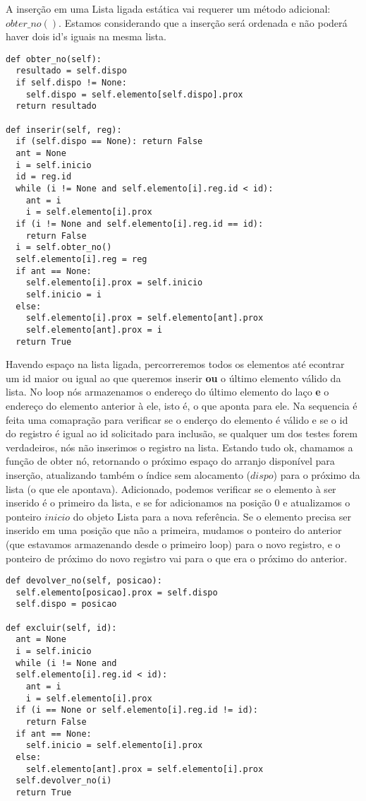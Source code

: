 \documentclass[a4paper, twocolumn]{article}
\theoremstyle{definition}
\begin{document}
A inserção em uma Lista ligada estática vai requerer um método adicional: $obter\_no()$. Estamos considerando que a inserção será ordenada e não poderá haver dois id's iguais na mesma lista.

\begin{lstlisting}[label=lista_ligada_estat_inserir,caption= Lista Ligada estática ordenada (inserção)]
def obter_no(self):
  resultado = self.dispo
  if self.dispo != None:
  	self.dispo = self.elemento[self.dispo].prox
  return resultado

def inserir(self, reg):
  if (self.dispo == None): return False
  ant = None
  i = self.inicio
  id = reg.id
  while (i != None and self.elemento[i].reg.id < id):
    ant = i
    i = self.elemento[i].prox
  if (i != None and self.elemento[i].reg.id == id): 
  	return False
  i = self.obter_no()
  self.elemento[i].reg = reg
  if ant == None:
    self.elemento[i].prox = self.inicio
    self.inicio = i
  else:
    self.elemento[i].prox = self.elemento[ant].prox
    self.elemento[ant].prox = i
  return True
\end{lstlisting}

Havendo espaço na lista ligada, percorreremos todos os elementos até econtrar um id maior ou igual ao que queremos inserir \textbf{ou} o último elemento válido da lista. No loop nós armazenamos o endereço do último elemento do laço \textbf{e} o endereço do elemento anterior à ele, isto é, o que aponta para ele. Na sequencia é feita uma comapração para verificar se o enderço do elemento é válido e se o id do registro é igual ao id solicitado para inclusão, se qualquer um dos testes forem verdadeiros, nós não inserimos o registro na lista. Estando tudo ok, chamamos a função de obter nó, retornando o próximo espaço do arranjo disponível para inserção, atualizando também o índice sem alocamento ($dispo$) para o próximo da lista (o que ele apontava). Adicionado, podemos verificar se o elemento à ser inserido é o primeiro da lista, e se for adicionamos na posição 0 e atualizamos o ponteiro $inicio$ do objeto Lista para a nova referência. Se o elemento precisa ser inserido em uma posição que não a primeira, mudamos o ponteiro do anterior (que estavamos armazenando desde o primeiro loop) para o novo registro, e o ponteiro de próximo do novo registro vai para o que era o próximo do anterior.

\begin{lstlisting}[label=lista_ligada_estat_remover,caption= Lista Ligada estática ordenada (remoção)]
def devolver_no(self, posicao):
  self.elemento[posicao].prox = self.dispo
  self.dispo = posicao

def excluir(self, id):
  ant = None
  i = self.inicio
  while (i != None and 
  self.elemento[i].reg.id < id):
    ant = i
    i = self.elemento[i].prox
  if (i == None or self.elemento[i].reg.id != id): 
  	return False
  if ant == None:
    self.inicio = self.elemento[i].prox
  else: 
    self.elemento[ant].prox = self.elemento[i].prox        
  self.devolver_no(i)
  return True
\end{lstlisting}
\end{document}

